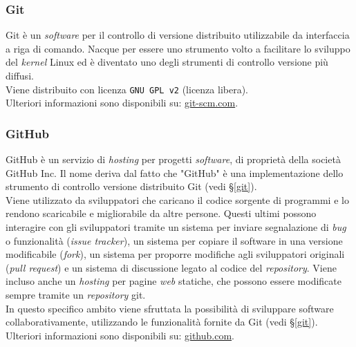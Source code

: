 
\subsubsection*{Git}
\label{git}
Git è un \textit{software} per il controllo di versione distribuito utilizzabile
da interfaccia a riga di comando.
Nacque per essere uno strumento volto a facilitare lo sviluppo del
\textit{kernel} Linux ed è diventato uno degli strumenti di controllo versione
più diffusi.\\
Viene distribuito con licenza \texttt{GNU GPL v2} (licenza libera). \\
Ulteriori informazioni sono disponibili su:
\href{https://git-scm.com/}{git-scm.com}.

\subsubsection*{GitHub}
\label{github}
GitHub è un servizio di \textit{hosting} per progetti \textit{software}, di
proprietà della società GitHub Inc.
Il nome deriva dal fatto che "GitHub" è una implementazione dello strumento di
controllo versione distribuito Git (vedi \S\ref{git}). \\
Viene utilizzato da sviluppatori che caricano il codice sorgente di programmi e
lo rendono scaricabile e migliorabile da altre persone.
Questi ultimi possono interagire con gli sviluppatori tramite un sistema per
inviare segnalazione di \textit{bug} o funzionalità (\textit{issue tracker}), un sistema
per copiare il software in una versione modificabile (\textit{fork}), un sistema
per proporre modifiche agli sviluppatori originali (\textit{pull request}) e un
sistema di discussione legato al codice del \textit{repository}.
Viene incluso anche un \textit{hosting} per pagine \textit{web} statiche, che
possono essere modificate sempre tramite un \textit{repository} git.\\
In questo specifico ambito viene sfruttata la possibilità di sviluppare software
collaborativamente, utilizzando le funzionalità fornite da
Git (vedi \S\ref{git}). \\
Ulteriori informazioni sono disponibili su:
\href{https://github.com/}{github.com}.

\newpage
